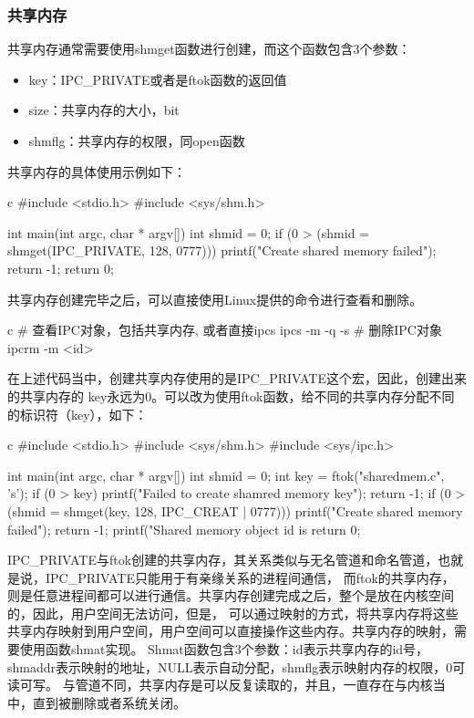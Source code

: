 \subsubsection{共享内存}
共享内存通常需要使用shmget函数进行创建，而这个函数包含3个参数：
\begin{itemize}
  \item key：IPC\_PRIVATE或者是ftok函数的返回值
  \item size：共享内存的大小，bit
  \item shmflg：共享内存的权限，同open函数
\end{itemize}
共享内存的具体使用示例如下：
\begin{code-block}{c}
#include <stdio.h>
#include <sys/shm.h>

int main(int argc, char * argv[])
{
        int shmid = 0;
        if (0 > (shmid = shmget(IPC_PRIVATE, 128, 0777)))
        {
                printf("Create shared memory failed\n");
                return -1;
        }
        return 0;
}
\end{code-block}

共享内存创建完毕之后，可以直接使用Linux提供的命令进行查看和删除。
\begin{code-block}{c}
# 查看IPC对象，包括共享内存, 或者直接ipcs
ipcs -m -q -s
# 删除IPC对象
ipcrm -m <id>
\end{code-block}
在上述代码当中，创建共享内存使用的是IPC\_PRIVATE这个宏，因此，创建出来的共享内存的
key永远为0。可以改为使用ftok函数，给不同的共享内存分配不同的标识符（key），如下：
\begin{code-block}{c}
#include <stdio.h>
#include <sys/shm.h>
#include <sys/ipc.h>

int main(int argc, char * argv[])
{
        int shmid = 0;
        int key = ftok("sharedmem.c", 's');
        if (0 > key)
        {
                printf("Failed to create shamred memory key\n");
                return -1;
        }
        if (0 > (shmid = shmget(key, 128, IPC_CREAT | 0777)))
        {
                printf("Create shared memory failed\n");
                return -1;
        }
        printf("Shared memory object id is %
        return 0;
}
\end{code-block}

IPC\_PRIVATE与ftok创建的共享内存，其关系类似与无名管道和命名管道，也就是说，IPC\_PRIVATE只能用于有亲缘关系的进程间通信，
而ftok的共享内存，则是任意进程间都可以进行通信。共享内存创建完成之后，整个是放在内核空间的，因此，用户空间无法访问，但是，
可以通过映射的方式，将共享内存将这些共享内存映射到用户空间，用户空间可以直接操作这些内存。共享内存的映射，需要使用函数shmat实现。
Shmat函数包含3个参数：id表示共享内存的id号，shmaddr表示映射的地址，NULL表示自动分配，shmflg表示映射内存的权限，0可读可写。
与管道不同，共享内存是可以反复读取的，并且，一直存在与内核当中，直到被删除或者系统关闭。

